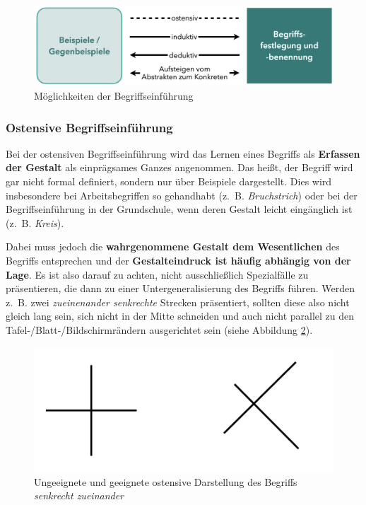 \documentclass[
]{scrbook}
\theoremstyle{definition}
\theoremstyle{definition}
\theoremstyle{definition}
\theoremstyle{definition}
\theoremstyle{remark}
\begin{document}
\begin{figure}

{\centering \includegraphics[width=0.75\linewidth]{pictures/7-Begriffe} 

}

\caption{Möglichkeiten der Begriffseinführung}\label{fig:Begriffseinfuehrung}
\end{figure}

\subsubsection{Ostensive Begriffseinführung}\label{ostensive-begriffseinfuxfchrung}

Bei der ostensiven Begriffseinführung wird das Lernen eines Begriffs als \textbf{Erfassen der Gestalt} als einprägsames Ganzes angenommen. Das heißt, der Begriff wird gar nicht formal definiert, sondern nur über Beispiele dargestellt. Dies wird insbesondere bei Arbeitsbegriffen so gehandhabt (z.~B. \emph{Bruchstrich}) oder bei der Begriffseinführung in der Grundschule, wenn deren Gestalt leicht eingänglich ist (z.~B. \emph{Kreis}).

Dabei muss jedoch die \textbf{wahrgenommene Gestalt dem Wesentlichen} des Begriffs entsprechen und der \textbf{Gestalteindruck ist häufig abhängig von der Lage}. Es ist also darauf zu achten, nicht ausschließlich Spezialfälle zu präsentieren, die dann zu einer Untergeneralisierung des Begriffs führen. Werden z.~B. zwei \emph{zueinenander senkrechte} Strecken präsentiert, sollten diese also nicht gleich lang sein, sich nicht in der Mitte schneiden und auch nicht parallel zu den Tafel-/Blatt-/Bildschirmrändern ausgerichtet sein (siehe Abbildung \ref{fig:SenkrechtOstensiv}).



\begin{figure}

{\centering \includegraphics[width=0.5\linewidth]{pictures/7-senkrecht} 

}

\caption{Ungeeignete und geeignete ostensive Darstellung des Begriffs \emph{senkrecht zueinander}}\label{fig:SenkrechtOstensiv}
\end{figure}
\end{document}
